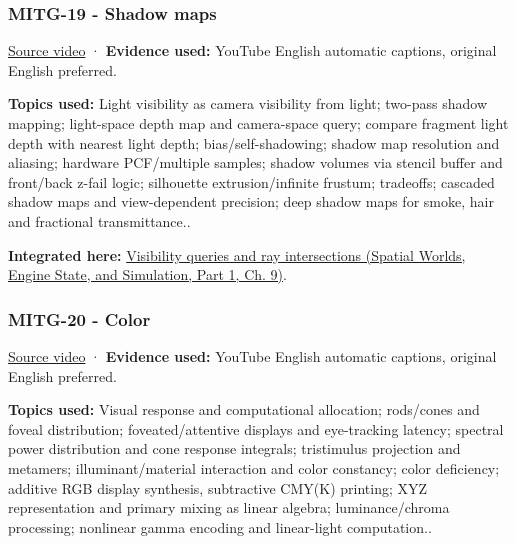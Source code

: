 \subsubsection{MITG-19 - Shadow maps}\label{04-visual-computing-ii-ch036-mitg-19---shadow-maps}

\hypertarget{04-visual-computing-ii-ch036-mitg-19---shadow-maps}{}

\href{https://www.youtube.com/watch?v=jDw_EbXv-1I}{Source video} · \textbf{Evidence used:} YouTube English automatic captions, original English preferred.

\textbf{Topics used:} Light visibility as camera visibility from light; two-pass shadow mapping; light-space depth map and camera-space query; compare fragment light depth with nearest light depth; bias/self-shadowing; shadow map resolution and aliasing; hardware PCF/multiple samples; shadow volumes via stencil buffer and front/back z-fail logic; silhouette extrusion/infinite frustum; tradeoffs; cascaded shadow maps and view-dependent precision; deep shadow maps for smoke, hair and fractional transmittance..

\textbf{Integrated here:} \href{../05-Spatial-Worlds-Engine-State-and-Simulation-P01/main.pdf\#nameddest=04-visual-computing-ii-ch028-visibility-queries-and-ray-intersections-1}{Visibility queries and ray intersections (Spatial Worlds, Engine State, and Simulation, Part 1, Ch. 9)}.

\subsubsection{MITG-20 - Color}\label{04-visual-computing-ii-ch036-mitg-20---color}

\hypertarget{04-visual-computing-ii-ch036-mitg-20---color}{}

\href{https://www.youtube.com/watch?v=aIVVBZ7cJBc}{Source video} · \textbf{Evidence used:} YouTube English automatic captions, original English preferred.

\textbf{Topics used:} Visual response and computational allocation; rods/cones and foveal distribution; foveated/attentive displays and eye-tracking latency; spectral power distribution and cone response integrals; tristimulus projection and metamers; illuminant/material interaction and color constancy; color deficiency; additive RGB display synthesis, subtractive CMY(K) printing; XYZ representation and primary mixing as linear algebra; luminance/chroma processing; nonlinear gamma encoding and linear-light computation..

